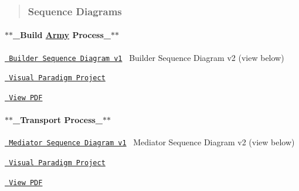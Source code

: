 \begin{quote}
\subsubsection*{Sequence Diagrams}

\end{quote}
\paragraph*{$\ast$$\ast$\+\_\+\+Build \mbox{\hyperlink{class_army}{Army}} Process\+\_\+$\ast$$\ast$  ~\newline
}

\href{https://drive.google.com/file/d/13JB2W5WKPMUYsIhw18f_Vfs5Z1nyeyTP/view?usp=share_link}{\texttt{ Builder Sequence Diagram v1}}~\newline
 Builder Sequence Diagram v2 (view below)
\begin{DoxyItemize}
\item \href{https://drive.google.com/file/d/1525KpkkEnW-G1LlFBWZVf8X7F61uvsMX/view?usp=share_link}{\texttt{ Visual Paradigm Project}}~\newline

\item \href{https://drive.google.com/file/d/13rsSv1n9F5QgrEgBERmESXupfMd6Ljot/view?usp=share_link}{\texttt{ View P\+DF}}~\newline

\end{DoxyItemize}

\paragraph*{$\ast$$\ast$\+\_\+\+Transport Process\+\_\+$\ast$$\ast$  ~\newline
}

\href{https://drive.google.com/file/d/1wvjcfvfr88HGQll9RNgF4ly6cWQ6xZgU/view?usp=share_link}{\texttt{ Mediator Sequence Diagram v1}}~\newline
 Mediator Sequence Diagram v2 (view below)
\begin{DoxyItemize}
\item \href{https://drive.google.com/file/d/1gbEZd8h8ZP1844zwQqUtYh7sdjuPc-vr/view?usp=share_link}{\texttt{ Visual Paradigm Project}}~\newline

\item \href{https://drive.google.com/file/d/1nV7S92MNhp_FFz35ETtaeTWApFezeMYu/view?usp=share_link}{\texttt{ View P\+DF}}~\newline

\end{DoxyItemize}



